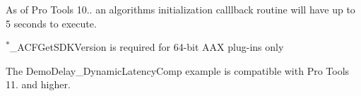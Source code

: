 \begin{DoxyRefList}
\label{a00786__compatibility_notes000010}%
%
 
\item[Module \mbox{\hyperlink{a00797}{Common\+Interface\+\_\+\+Algorithm}} ]\label{a00786__compatibility_notes000002}%
%
 As of Pro Tools 10.. an algorithm\textquotesingle{}s initialization calllback routine will have up to 5 seconds to execute. 
\item[Module \mbox{\hyperlink{a00801}{Common\+Interface\+\_\+\+Format\+Specification}} ]\label{a00786__compatibility_notes000003}%
%


\label{a00786__compatibility_notes000004}%
%


\label{a00786__compatibility_notes000005}%
%


\label{a00786__compatibility_notes000006}%
%
 \textsuperscript{$\ast$}{\ttfamily \+\_\+\+A\+C\+F\+Get\+S\+D\+K\+Version} is required for 64-\/bit A\+AX plug-\/ins only 
\item[Module \mbox{\hyperlink{a00848}{Example\+Plug\+Ins}} ]\label{a00786__compatibility_notes000011}%
%
 The Demo\+Delay\+\_\+\+Dynamic\+Latency\+Comp example is compatible with Pro Tools 11. and higher.
\end{DoxyRefList}